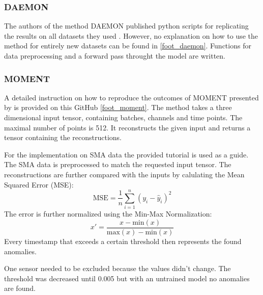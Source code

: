 \subsubsection{DAEMON}
The authors of the method DAEMON published python scripts for replicating the results on all datasets they used \cite{chen_adversarial_2023}. However, no explanation on how to use the method for entirely new datasets can be found in \autoref{foot_daemon}. Functions for data preprocessing and a forward pass throught the model are written.

\subsubsection{MOMENT}
A detailed instruction on how to reproduce the outcomes of MOMENT presented by \cite{goswami_moment_2024} is provided on this GitHub \autoref{foot_moment}. The method takes a three dimensional input tensor, containing batches, channels and time points. The maximal number of points is 512. It reconstructs the given input and returns a tensor containing the reconstructions.

For the implementation on SMA data the provided tutorial is used as a guide. The SMA data is preprocessed to match the requested input tensor. The reconstructions are further compared with the inputs by calulating the Mean Squared Error (MSE):
\begin{equation}
    \text{MSE} = \frac{1}{n} \sum_{i=1}^{n} \left( y_i - \hat{y}_i \right)^2
\end{equation}
The error is further normalized using the Min-Max Normalization:
\begin{equation}
x' = \frac{x - \text{min}(x)}{\text{max}(x) - \text{min}(x)}
\end{equation}
Every timestamp that exceeds a certain threshold then represents the found anomalies.

One sensor needed to be excluded because the values didn't change. The threshold was decreased until 0.005 but with an untrained model no anomalies are found.
